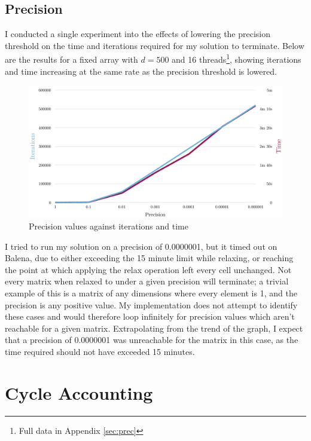 \documentclass[12pt]{article}
\begin{document}
\subsection{Precision}

I conducted a single experiment into the effects of lowering the precision threshold on the time and iterations required for my solution to terminate. Below are the results for a fixed array with $d=500$ and 16 threads\footnote{Full data in Appendix \ref{sec:prec}}, showing iterations and time increasing at the same rate as the precision threshold is lowered.

\begin{figure}[h!]
	\hspace{-0.8cm}\includegraphics[width=1.1\textwidth]{img/prec-time.pdf}
	\caption{Precision values against iterations and time}
	\label{fig:precision}
\end{figure}


I tried to run my solution on a precision of 0.0000001, but it timed out on Balena, due to either exceeding the 15 minute limit while relaxing, or reaching the point at which applying the relax operation left every cell unchanged. Not every matrix when relaxed to under a given precision will terminate; a trivial example of this is a matrix of any dimensions where every element is 1, and the precision is any positive value. My implementation does not attempt to identify these cases and would therefore loop infinitely for precision values which aren't reachable for a given matrix. Extrapolating from the trend of the graph, I expect that a precision of 0.0000001 was unreachable for the matrix in this case, as the time required should not have exceeded 15 minutes.


\clearpage
\section{Cycle Accounting}
\end{document}
